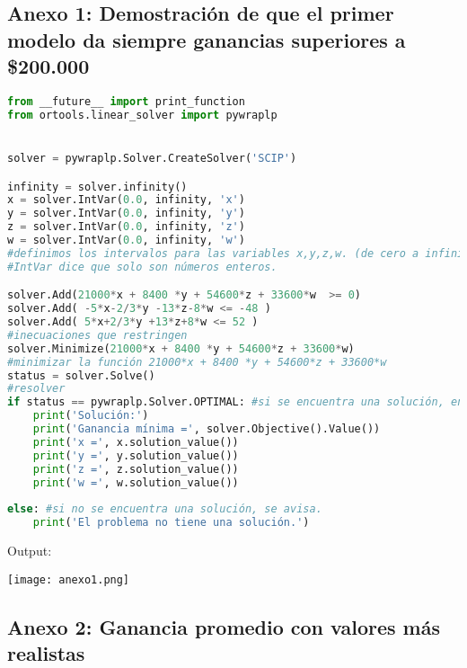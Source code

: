 \documentclass[a4paper]{article}
\begin{document}
\subsection{Anexo 1: Demostración de que el primer modelo da siempre ganancias superiores a \$200.000}
\begin{lstlisting}[language=Python]
from __future__ import print_function
from ortools.linear_solver import pywraplp


solver = pywraplp.Solver.CreateSolver('SCIP')

infinity = solver.infinity()
x = solver.IntVar(0.0, infinity, 'x')
y = solver.IntVar(0.0, infinity, 'y')
z = solver.IntVar(0.0, infinity, 'z')
w = solver.IntVar(0.0, infinity, 'w')
#definimos los intervalos para las variables x,y,z,w. (de cero a infinito)
#IntVar dice que solo son números enteros.

solver.Add(21000*x + 8400 *y + 54600*z + 33600*w  >= 0)
solver.Add( -5*x-2/3*y -13*z-8*w <= -48 )
solver.Add( 5*x+2/3*y +13*z+8*w <= 52 )  
#inecuaciones que restringen
solver.Minimize(21000*x + 8400 *y + 54600*z + 33600*w)
#minimizar la función 21000*x + 8400 *y + 54600*z + 33600*w 
status = solver.Solve()
#resolver 
if status == pywraplp.Solver.OPTIMAL: #si se encuentra una solución, entonces se dan las soluciones. 
    print('Solución:')
    print('Ganancia mínima =', solver.Objective().Value())
    print('x =', x.solution_value())
    print('y =', y.solution_value())
    print('z =', z.solution_value())
    print('w =', w.solution_value())
    
else: #si no se encuentra una solución, se avisa. 
    print('El problema no tiene una solución.')
\end{lstlisting} 
Output:
\begin{center}
    \texttt{[image: anexo1.png]}
\end{center}
\subsection{Anexo 2: Ganancia promedio con valores más realistas}
\end{document}
